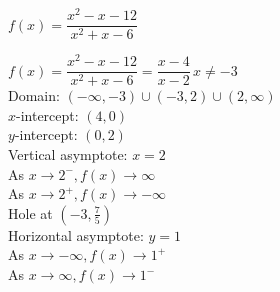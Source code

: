 {$f(x) = \dfrac{x^2-x-12}{x^2+x-6}$}
{$f(x) = \dfrac{x^2-x-12}{x^{2} +x - 6} = \dfrac{x-4}{x - 2} \, x \neq -3$\\
Domain: $(-\infty, -3) \cup (-3, 2) \cup (2, \infty)$\\
$x$-intercept:  $(4,0)$\\
$y$-intercept:  $(0,2)$\\
Vertical asymptote: $x = 2$\\
As $x \rightarrow 2^{-}, f(x) \rightarrow \infty$\\
As $x \rightarrow 2^{+}, f(x) \rightarrow -\infty$\\
Hole at $\left(-3, \frac{7}{5} \right)$ \\
Horizontal asymptote: $y = 1$ \\
As $x \rightarrow -\infty, f(x) \rightarrow 1^{+}$\\
As $x \rightarrow \infty, f(x) \rightarrow 1^{-}$


\begin{center}
\end{center}}